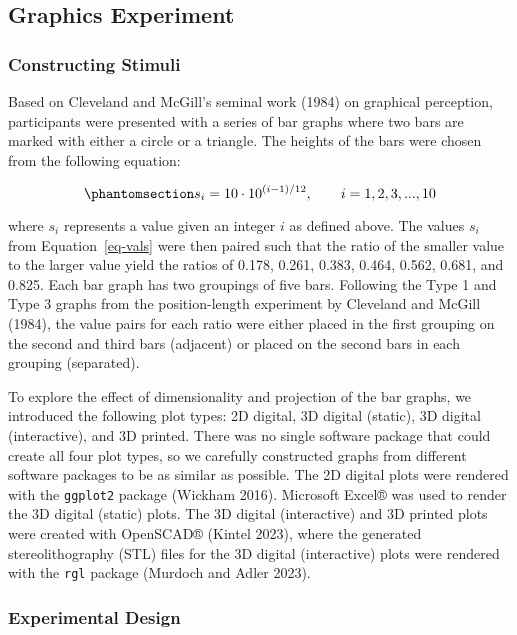 \documentclass[
  12pt,
]{article}
\begin{document}
\subsection{Graphics Experiment}\label{graphics-experiment}

\subsubsection{Constructing Stimuli}\label{constructing-stimuli}

Based on Cleveland and McGill's seminal work (1984) on graphical
perception, participants were presented with a series of bar graphs
where two bars are marked with either a circle or a triangle. The
heights of the bars were chosen from the following equation:

\begin{equation}\phantomsection\label{eq-vals}{s_i=10\cdot 10^{(i-1)/12}, \qquad i=1,2,3,...,10}\end{equation}

where \(s_i\) represents a value given an integer \(i\) as defined
above. The values \(s_i\) from Equation~\ref{eq-vals} were then paired
such that the ratio of the smaller value to the larger value yield the
ratios of 0.178, 0.261, 0.383, 0.464, 0.562, 0.681, and 0.825. Each bar
graph has two groupings of five bars. Following the Type 1 and Type 3
graphs from the position-length experiment by Cleveland and McGill
(1984), the value pairs for each ratio were either placed in the first
grouping on the second and third bars (adjacent) or placed on the second
bars in each grouping (separated).

To explore the effect of dimensionality and projection of the bar
graphs, we introduced the following plot types: 2D digital, 3D digital
(static), 3D digital (interactive), and 3D printed. There was no single
software package that could create all four plot types, so we carefully
constructed graphs from different software packages to be as similar as
possible. The 2D digital plots were rendered with the \texttt{ggplot2}
package (Wickham 2016). Microsoft Excel® was used to render the 3D
digital (static) plots. The 3D digital (interactive) and 3D printed
plots were created with OpenSCAD® (Kintel 2023), where the generated
stereolithography (STL) files for the 3D digital (interactive) plots
were rendered with the \texttt{rgl} package (Murdoch and Adler 2023).

\subsubsection{Experimental Design}\label{experimental-design}
\end{document}
